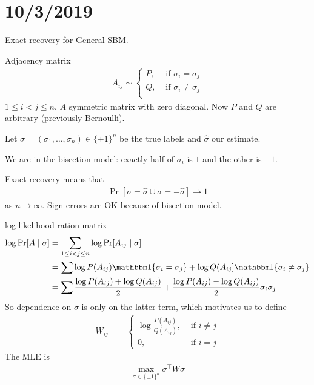 \section{10/3/2019}%

Exact recovery for General SBM.

Adjacency matrix
\begin{align}
  A_{ij} \sim \begin{cases}
    P, &\text{ if }\sigma_i = \sigma_j\\
    Q, &\text{ if }\sigma_i \neq \sigma_j\\
  \end{cases}
\end{align}
$1 \leq i < j \leq n$, $A$ symmetric matrix with zero diagonal.
Now $P$ and $Q$ are arbitrary (previously Bernoulli).

Let $\sigma = (\sigma_1,\ldots,\sigma_n) \in \{\pm 1\}^n$ be the true
labels and $\hat\sigma$ our estimate.

We are in the bisection model: exactly half of $\sigma_i$ is $1$
and the other is $-1$.

Exact recovery means that
\begin{align}
  \Pr[\sigma = \hat\sigma \cup \sigma = -\hat\sigma] \to 1
\end{align}
as $n \to \infty$. Sign errors are OK because of bisection model.


log likelihood ration matrix
\begin{align}
  \log \Pr[A \mid \sigma]
  &= \sum_{1 \leq i < j \leq n} \log \Pr[A_{ij} \mid \sigma] \\
  &= \sum \log P(A_{ij}) \ind\{\sigma_i = \sigma_j\}
  + \log Q(A_{ij}] \ind\{\sigma_i \neq \sigma_j\} \\
  &= \sum \frac{\log P(A_{ij})  + \log Q(A_{ij})}{2}
  + \frac{\log P(A_{ij}) - \log Q(A_{ij})}{2} \sigma_i \sigma_j
\end{align}
So dependence on $\sigma$ is only on the latter term, which
motivates us to define
\begin{align}
  W_{ij} &= \begin{cases}
    \log \frac{P(A_{ij})}{Q(A_{ij})} , &\text{ if }i \neq j\\
    0, &\text{ if } i=j
  \end{cases}
\end{align}
The MLE is
\begin{align}
  \max_{\sigma \in \{\pm 1\}^n} \sigma^\top W \sigma
\end{align}

